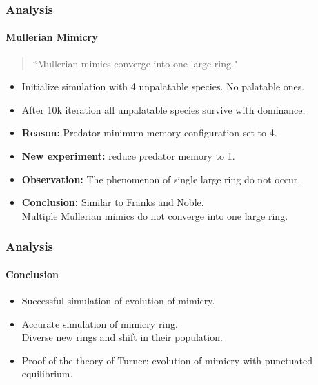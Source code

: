 \frame
{
	\frametitle{Analysis}
	\framesubtitle{Mullerian Mimicry}

	\begin{quote}
		``Mullerian mimics converge into one large ring."
	\end{quote}
	
	\begin{itemize}
		\item Initialize simulation with 4 unpalatable species. No palatable ones.
		\item After 10k iteration all unpalatable species survive with dominance.
		\item \textbf{Reason:} Predator minimum memory configuration set to 4.
	\end{itemize}
	
	\begin{itemize}
		\item \textbf{New experiment:} reduce predator memory to 1.\\
		\item \textbf{Observation:} The phenomenon of single large ring do not occur. 
		\item \textbf{Conclusion:} Similar to Franks and Noble.\\
		Multiple Mullerian mimics do not converge into one large ring.
	\end{itemize}	
}

\frame
{
	\frametitle{Analysis}
	\framesubtitle{Conclusion}

	\begin{itemize}
		\item Successful simulation of evolution of mimicry.
		\item Accurate simulation of mimicry ring.\\
		Diverse new rings and shift in their population.
		\item Proof of the theory of Turner: evolution of mimicry with punctuated equilibrium.
	\end{itemize}
}